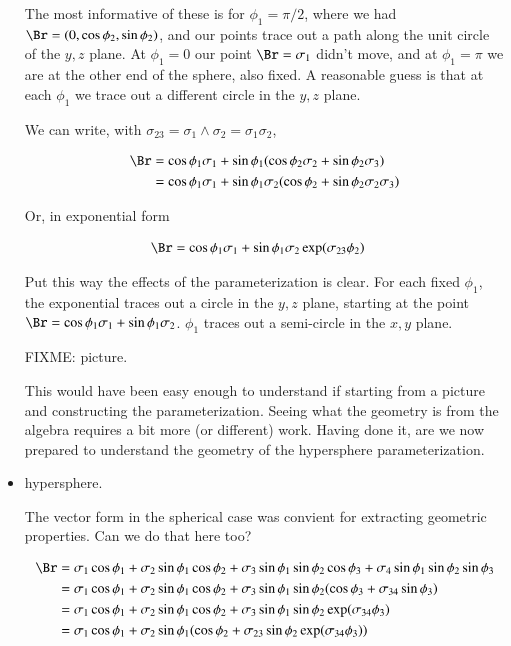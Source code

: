 \documentclass{article}
\begin{document}
\begin{itemize}
The most informative of these is for $\phi_1 = \pi/2$, where we had $\Br = (0, \cos\phi_2, \sin\phi_2)$, and our points trace out a path along the unit circle of the $y,z$ plane.  At $\phi_1 = 0$ our point $\Br = \sigma_1$ didn't move, and at $\phi_1 = \pi$ we are at the other end of the sphere, also fixed.  A reasonable guess is that at each $\phi_1$ we trace out a different circle in the $y,z$ plane.

We can write, with $\sigma_{23} = \sigma_1 \wedge \sigma_2 = \sigma_1 \sigma_2$,

\begin{align*}
\Br 
&= \cos\phi_1 \sigma_1 + \sin\phi_1 ( \cos\phi_2 \sigma_2 + \sin\phi_2 \sigma_3 ) \\
&= \cos\phi_1 \sigma_1 + \sin\phi_1 \sigma_2 ( \cos\phi_2 + \sin\phi_2 \sigma_2 \sigma_3 ) \\
\end{align*}

Or, in exponential form

\begin{align}\label{eqn:sphereVec}
\Br &= \cos\phi_1 \sigma_1 + \sin\phi_1 \sigma_2 \exp( \sigma_{23} \phi_2 )
\end{align}

Put this way the effects of the parameterization is clear.   For each fixed $\phi_1$, the exponential traces out a circle in the $y,z$ plane, starting at the point $\Br = \cos\phi_1 \sigma_1 + \sin\phi_1 \sigma_2$.  $\phi_1$ traces out a semi-circle in the $x,y$ plane.

FIXME: picture.

This would have been easy enough to understand if starting from a picture and constructing the parameterization.  Seeing what the 
geometry is from the algebra requires a bit more (or different) work.  Having done it, are we now prepared to understand the geometry 
of the hypersphere parameterization.

\item hypersphere.

The vector form in the spherical case was convient for extracting geometric properties.  Can we do that here too?

\begin{align*}
\Br
&= \sigma_1 \cos\phi_1 + \sigma_2 \sin\phi_1 \cos\phi_2 + \sigma_3 \sin\phi_1 \sin\phi_2 \cos\phi_3 + \sigma_4 \sin\phi_1 \sin\phi_2 \sin\phi_3 \\
&= \sigma_1 \cos\phi_1 + \sigma_2 \sin\phi_1 \cos\phi_2 + \sigma_3 \sin\phi_1 \sin\phi_2 (\cos\phi_3 + \sigma_{34} \sin\phi_3) \\
&= \sigma_1 \cos\phi_1 + \sigma_2 \sin\phi_1 \cos\phi_2 + \sigma_3 \sin\phi_1 \sin\phi_2 \exp(\sigma_{34}\phi_3) \\
&= \sigma_1 \cos\phi_1 + \sigma_2 \sin\phi_1 (\cos\phi_2 + \sigma_{23} \sin\phi_2 \exp(\sigma_{34}\phi_3) ) \\
\end{align*}


\end{itemize}
\end{document}
